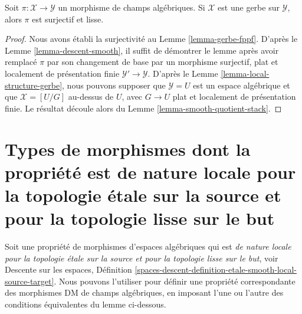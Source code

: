 \begin{lemma}
\label{lemma-gerbe-smooth}
Soit $\pi : \mathcal{X} \to \mathcal{Y}$ un morphisme de champs algébriques.
Si $\mathcal{X}$ est une gerbe sur $\mathcal{Y}$, alors $\pi$ est surjectif
et lisse.
\end{lemma}

\begin{proof}
Nous avons établi la surjectivité au Lemme \ref{lemma-gerbe-fppf}.
D'après le Lemme \ref{lemma-descent-smooth},
il suffit de démontrer le lemme après avoir remplacé $\pi$ par son changement de base
par un morphisme surjectif, plat et localement de présentation finie
$\mathcal{Y}' \to \mathcal{Y}$. D'après le
Lemme \ref{lemma-local-structure-gerbe},
nous pouvons supposer que $\mathcal{Y} = U$ est un espace algébrique et que
$\mathcal{X} = [U/G]$ au-dessus de $U$, avec $G \to U$ plat et
localement de présentation finie.
Le résultat découle alors du Lemme \ref{lemma-smooth-quotient-stack}.
\end{proof}




\section[Morphismes DM : localité étale-lisse]{Types de morphismes dont la propriété est de nature locale pour la topologie \'etale sur la source et pour la topologie lisse sur le but}
\label{section-etale-smooth-local-source-target}

\noindent
Soit une propriété de morphismes d'espaces algébriques qui est
{\it de nature locale pour la topologie \'etale sur la source et pour la topologie lisse sur le but}, voir
Descente sur les espaces,
Définition \ref{spaces-descent-definition-etale-smooth-local-source-target}.
Nous pouvons l'utiliser pour définir une propriété correspondante
des morphismes DM de champs algébriques, en imposant l'une ou l'autre
des conditions équivalentes du lemme ci-dessous.


